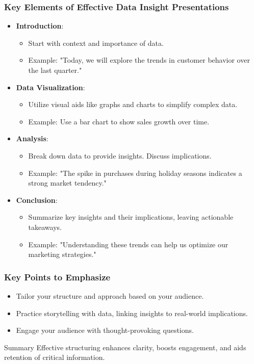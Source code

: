 \documentclass[aspectratio=169]{beamer}
\begin{document}
\begin{frame}[fragile]
    \frametitle{Key Elements of Effective Data Insight Presentations}
    
    \begin{itemize}
        \item \textbf{Introduction}:
        \begin{itemize}
            \item Start with context and importance of data.
            \item Example: "Today, we will explore the trends in customer behavior over the last quarter."
        \end{itemize}
        
        \item \textbf{Data Visualization}:
        \begin{itemize}
            \item Utilize visual aids like graphs and charts to simplify complex data.
            \item Example: Use a bar chart to show sales growth over time.
        \end{itemize}
        
        \item \textbf{Analysis}:
        \begin{itemize}
            \item Break down data to provide insights. Discuss implications.
            \item Example: "The spike in purchases during holiday seasons indicates a strong market tendency."
        \end{itemize}

        \item \textbf{Conclusion}:
        \begin{itemize}
            \item Summarize key insights and their implications, leaving actionable takeaways.
            \item Example: "Understanding these trends can help us optimize our marketing strategies."
        \end{itemize}
    \end{itemize}
\end{frame}

\begin{frame}[fragile]
    \frametitle{Key Points to Emphasize}
    \begin{itemize}
        \item Tailor your structure and approach based on your audience.
        \item Practice storytelling with data, linking insights to real-world implications.
        \item Engage your audience with thought-provoking questions.
    \end{itemize}

    \begin{block}{Summary}
        Effective structuring enhances clarity, boosts engagement, and aids retention of critical information.
    \end{block}
\end{frame}
\end{document}
